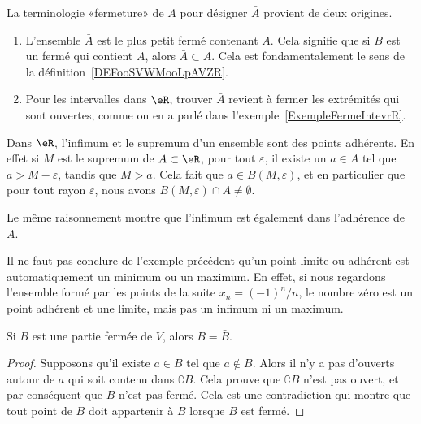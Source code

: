 \begin{example}     \label{EXooICLBooJzQFNY}
	La terminologie «fermeture» de $A$ pour désigner $\bar A$ provient de deux origines.
	\begin{enumerate}
		\item
		      L'ensemble $\bar A$ est le plus petit fermé contenant $A$. Cela signifie que si $B$ est un fermé qui contient $A$, alors $\bar A\subset A$. Cela est fondamentalement le sens de la définition~\ref{DEFooSVWMooLpAVZR}.
		\item
		      Pour les intervalles dans $\eR$, trouver $\bar A$ revient à fermer les extrémités qui sont ouvertes, comme on en a parlé dans l'exemple~\ref{ExempleFermeIntevrR}.
	\end{enumerate}
\end{example}

\begin{example}
	Dans $\eR$, l'infimum et le supremum d'un ensemble sont des points adhérents. En effet si $M$ est le supremum de $A\subset\eR$, pour tout $\varepsilon$, il existe un $a\in A$ tel que $a>M-\varepsilon$, tandis que $M>a$. Cela fait que $a\in B(M,\varepsilon)$, et en particulier que pour tout rayon $\varepsilon$, nous avons $B(M,\varepsilon)\cap A\neq\emptyset$.

	Le même raisonnement montre que l'infimum est également dans l'adhérence de $A$.
\end{example}

\begin{example}		\label{ParlerEncoredeF}
	Il ne faut pas conclure de l'exemple précédent qu'un point limite ou adhérent est automatiquement un minimum ou un maximum. En effet, si nous regardons l'ensemble formé par les points de la suite $x_n=(-1)^n/n$, le nombre zéro est un point adhérent et une limite, mais pas un infimum ni un maximum.
\end{example}

\begin{lemma}
	Si $B$ est une partie fermée de $V$, alors $B=\bar B$.
\end{lemma}

\begin{proof}
	Supposons qu'il existe $a\in\bar B$ tel que $a\notin B$. Alors il n'y a pas d'ouverts autour de $a$ qui soit contenu dans $\complement B$. Cela prouve que $\complement B$ n'est pas ouvert, et par conséquent que $B$ n'est pas fermé. Cela est une contradiction qui montre que tout point de $\bar B$ doit appartenir à $B$ lorsque $B$ est fermé.
\end{proof}

